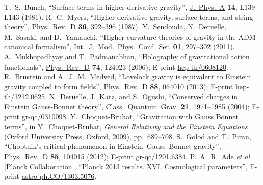 \documentclass[a4paper,showkeys,aps,prd,reprint,nofootinbib,showpacs,twocolumn]{revtex4-1}
\theoremstyle{plain}
\begin{document}
{\begin{thebibliography}{99}
T.~S.~Bunch,
  ``Surface terms in higher derivative gravity'', 
  \href{http://iopscience.iop.org/0305-4470/14/5/008}{J.\ Phys.\ A} {\bf 14}, L139--L143 (1981).
  R.~C.~Myers,
  ``Higher-derivative gravity, surface terms, and string theory'', 
  \href{http://prd.aps.org/abstract/PRD/v36/i2/p392_1}{Phys.\ Rev.\ D} {\bf 36}, 392--396 (1987).
  Y.~Sendouda, N.~Deruelle, M.~Sasaki, and D.~Yamauchi,
  ``Higher curvature theories of gravity in the ADM canonical formalism'', 
  \href{http://www.worldscientific.com/doi/abs/10.1142/S2010194511000432}{Int.\ J.\ Mod.\ Phys.\ Conf.\ Ser.} {\bf 01}, 297--302 (2011).
  A.~Mukhopadhyay and T.~Padmanabhan,
  ``Holography of gravitational action functionals'', 
  \href{http://prd.aps.org/abstract/PRD/v74/i12/e124023}{Phys.\ Rev.\ D} {\bf 74}, 124023 (2006);
  E-print \href{http://arxiv.org/abs/hep-th/0608120}{hep-th/0608120}.
  R.~Brustein and A.~J.~M.~Medved,
  ``Lovelock gravity is equivalent to Einstein gravity coupled to form fields'', 
  \href{http://link.aps.org/doi/10.1103/PhysRevD.88.064010}{Phys.\ Rev.\ D} {\bf 88}, 064010 (2013); 
  E-print \href{http://arxiv.org/abs/arXiv:1212.0625}{hep-th/1212.0625}.
  N.~Deruelle, J.~Katz, and S.~Ogushi,
  ``Conserved charges in Einstein Gauss-Bonnet theory'', 
  \href{http://iopscience.iop.org/0264-9381/21/8/004/}{Class.~Quantum~Grav.} {\bf 21}, 1971--1985 (2004); 
  E-print \href{http://arxiv.org/abs/gr-qc/0310098}{gr-qc/0310098}.
  Y.~Choquet-Bruhat,
  ``Gravitation with Gauss Bonnet terms'', 
  in Y.~Choquet-Bruhat, {\em General Relativity and the Einstein Equations\/} 
  (Oxford University Press, Oxford, 2009), pp.~689--708.
  S.~Golod and T.~Piran,
  ``Choptuik's critical phenomenon in Einstein--Gauss--Bonnet gravity'', 
  \href{http://prd.aps.org/abstract/PRD/v85/i10/e104015}{Phys.\ Rev.\ D} {\bf 85}, 104015 (2012);
  E-print \href{http://arxiv.org/abs/arXiv:1201.6384}{gr-qc/1201.6384}.
P.~A.~R.~Ade {\em et al.\/} [Planck Collaboration], 
``Planck 2013 results. XVI. Cosmological parameters'', 
E-print \href{http://arxiv.org/abs/1303.5076}{astro-ph.CO/1303.5076}.


\end{thebibliography}} 
%
%
%
\end{document}

